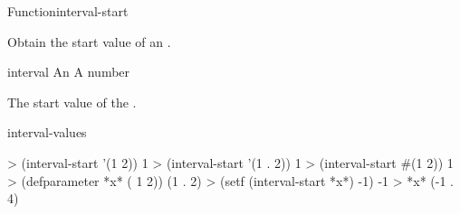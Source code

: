 \documentclass[10pt,twoside,english,pdftex]{article}
\begin{document}
\begin{functiondoc}{Function}{interval-start}%
  { 
    \returns{} }
%
%

\fnsyntax

\fnpurpose Obtain the start value of an .

\fnsetf
{}

\fnpackage {}

\fnmodule {}

\fnargs
\begin{args}{interval}
\arg[interval] An 
 A number
\end{args}

\fnreturns The start value of the .

\begin{alsos}{interval-values}
\end{alsos}

\fnexamples
%
%
\W\supp
\begin{example}
> (interval-start '(1 2))
1
> (interval-start '(1 . 2))
1
> (interval-start #(1 2))
1\goodpagebreak
> (defparameter *x* ( 1 2))
(1 . 2)
> (setf (interval-start *x*) -1)
-1
> *x*
(-1 . 4)

\end{example}

\end{functiondoc}

\end{document}
